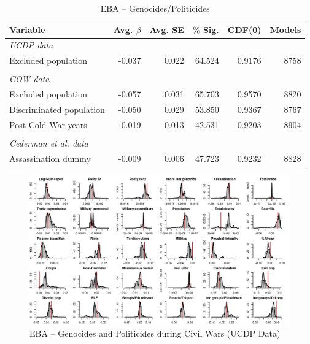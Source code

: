 \vspace{1cm}

\begin{table}[H]
\centering
\begin{tabular}{lrrrrr}
\hline
\textbf{Variable} & \textbf{Avg. $\beta$} & \textbf{Avg. SE} & \textbf{$\%$ Sig.} & \textbf{CDF(0)} & \textbf{Models} \\ \hline
\textit{UCDP data} &  &  &  &  &  \\
Excluded population & -0.037 & 0.022 & 64.524 & 0.9176 & 8758 \\
 &  &  &  &  &  \\
\textit{COW data} &  &  &  &  &  \\
Excluded population & -0.057 & 0.031 & 65.703 & 0.9570 & 8820 \\
Discriminated population & -0.050 & 0.029 & 53.850 & 0.9367 & 8767 \\
Post-Cold War years & -0.019 & 0.013 & 42.531 & 0.9203 & 8904 \\
 &  &  &  &  &  \\
\textit{Cederman et al. data} &  &  &  &  &  \\
Assassination dummy & -0.009 & 0.006 & 47.723 & 0.9232 & 8828 \\ \hline
\end{tabular}
\caption{EBA -- Genocides/Politicides}
\label{tab:uamk1}
\end{table}

\clearpage
\begin{figure}
    \centering
    \includegraphics[width=\textwidth]{images/uamk-ucdp.pdf}
    \caption{EBA -- Genocides and Politicides during Civil Wars (UCDP Data)}
    \label{fig:uamk-ucdp}
\end{figure}
\clearpage

